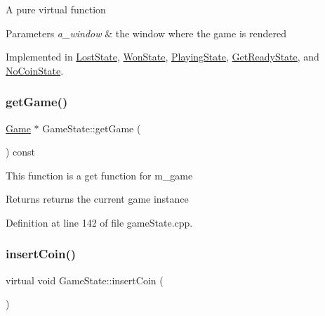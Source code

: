 A pure virtual function


\begin{DoxyParams}{Parameters}
{\em a\+\_\+window} & the window where the game is rendered \\
\hline
\end{DoxyParams}


Implemented in \hyperlink{class_lost_state_acfdefa77d7ed756a1052d39ed2de8786}{Lost\+State}, \hyperlink{class_won_state_a88bcef07ae234fe7ba672d1c6628d2c0}{Won\+State}, \hyperlink{class_playing_state_aa6c7033a5c734ba1ae4aae0905554d61}{Playing\+State}, \hyperlink{class_get_ready_state_a5526ece0f8f8becab78b78fbc7919045}{Get\+Ready\+State}, and \hyperlink{class_no_coin_state_ab1e920e22b90f9d36954e75ea49c3f9b}{No\+Coin\+State}.

\mbox{\label{class_game_state_a7f1afbce585f48311006ddb00c26e32f}} 
\subsubsection{\texorpdfstring{get\+Game()}{getGame()}}
{\footnotesize\ttfamily \hyperlink{class_game}{Game} $\ast$ Game\+State\+::get\+Game (\begin{DoxyParamCaption}{ }\end{DoxyParamCaption}) const}

This function is a get function for m\+\_\+game

\begin{DoxyReturn}{Returns}
returns the current game instance 
\end{DoxyReturn}


Definition at line 142 of file game\+State.\+cpp.

\mbox{\label{class_game_state_a4cd6f5b4ad23fc08dca287df26d94b94}} 
\subsubsection{\texorpdfstring{insert\+Coin()}{insertCoin()}}
{\footnotesize\ttfamily virtual void Game\+State\+::insert\+Coin (\begin{DoxyParamCaption}{ }\end{DoxyParamCaption})\hspace{0.3cm}{\ttfamily [pure virtual]}}

